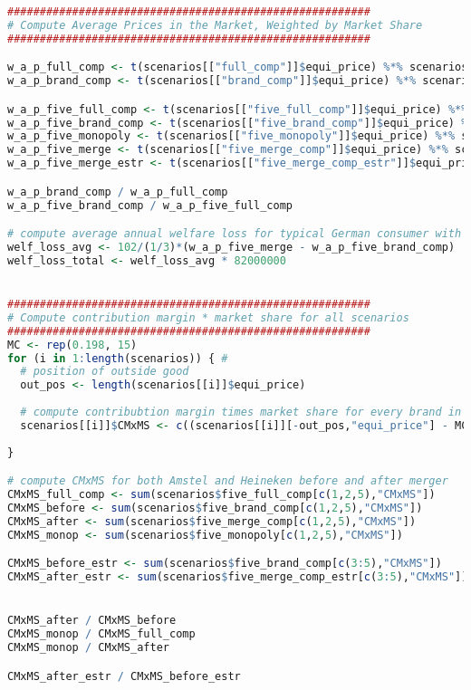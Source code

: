 \begin{lstlisting}[language=R,caption={Computation of weighed average prices and profits (i.e. $CMxMS$)}, label=lst_compute_metrics]
########################################################
# Compute Average Prices in the Market, Weighted by Market Share
########################################################

w_a_p_full_comp <- t(scenarios[["full_comp"]]$equi_price) %*% scenarios[["full_comp"]]$equi_share
w_a_p_brand_comp <- t(scenarios[["brand_comp"]]$equi_price) %*% scenarios[["brand_comp"]]$equi_share

w_a_p_five_full_comp <- t(scenarios[["five_full_comp"]]$equi_price) %*% scenarios[["five_full_comp"]]$equi_share
w_a_p_five_brand_comp <- t(scenarios[["five_brand_comp"]]$equi_price) %*% scenarios[["five_brand_comp"]]$equi_share
w_a_p_five_monopoly <- t(scenarios[["five_monopoly"]]$equi_price) %*% scenarios[["five_monopoly"]]$equi_share
w_a_p_five_merge <- t(scenarios[["five_merge_comp"]]$equi_price) %*% scenarios[["five_merge_comp"]]$equi_share
w_a_p_five_merge_estr <- t(scenarios[["five_merge_comp_estr"]]$equi_price) %*% scenarios[["five_merge_comp_estr"]]$equi_share

w_a_p_brand_comp / w_a_p_full_comp
w_a_p_five_brand_comp / w_a_p_five_full_comp

# compute average annual welfare loss for typical German consumer with the merger
welf_loss_avg <- 102/(1/3)*(w_a_p_five_merge - w_a_p_five_brand_comp)
welf_loss_total <- welf_loss_avg * 82000000


########################################################
# Compute contribution margin * market share for all scenarios
########################################################
MC <- rep(0.198, 15)
for (i in 1:length(scenarios)) { #
  # position of outside good
  out_pos <- length(scenarios[[i]]$equi_price)
  
  # compute contribubtion margin times market share for every brand in every scenario in the list
  scenarios[[i]]$CMxMS <- c((scenarios[[i]][-out_pos,"equi_price"] - MC[1:out_pos-1]) * scenarios[[i]][-out_pos,"equi_share"], NA)
  
}

# compute CMxMS for both Amstel and Heineken before and after merger
CMxMS_full_comp <- sum(scenarios$five_full_comp[c(1,2,5),"CMxMS"])
CMxMS_before <- sum(scenarios$five_brand_comp[c(1,2,5),"CMxMS"])
CMxMS_after <- sum(scenarios$five_merge_comp[c(1,2,5),"CMxMS"])
CMxMS_monop <- sum(scenarios$five_monopoly[c(1,2,5),"CMxMS"])

CMxMS_before_estr <- sum(scenarios$five_brand_comp[c(3:5),"CMxMS"])
CMxMS_after_estr <- sum(scenarios$five_merge_comp_estr[c(3:5),"CMxMS"])


CMxMS_after / CMxMS_before
CMxMS_monop / CMxMS_full_comp
CMxMS_monop / CMxMS_after

CMxMS_after_estr / CMxMS_before_estr

\end{lstlisting}